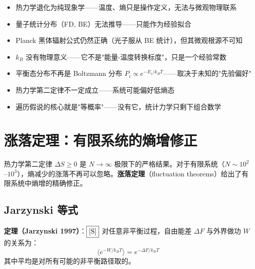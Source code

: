 \begin{limitbox}[若无 $S = k_B\ln W$（无微观-宏观桥梁）]
  \begin{itemize}
    \item 热力学退化为纯现象学——温度、熵只是操作定义，无法与微观物理联系
    \item 量子统计分布（FD, BE）无法推导——只能作为经验拟合
    \item Planck 黑体辐射公式仍然正确（光子服从 BE 统计），但其微观根源不可知
    \item $k_B$ 没有物理意义——它不是"能量-温度转换标度"，只是一个经验常数
  \end{itemize}
\end{limitbox}

\begin{limitbox}
  \begin{itemize}
    \item 平衡态分布不再是 Boltzmann 分布 $P_i \propto e^{-E_i/k_BT}$——取决于未知的"先验偏好"
    \item 热力学第二定律不一定成立——系统可能偏好低熵态
    \item 遍历假说的核心就是"等概率"——没有它，统计力学只剩下组合数学
  \end{itemize}
\end{limitbox}

\section{涨落定理：有限系统的熵增修正}

热力学第二定律 $\Delta S \ge 0$ 是 $N \to \infty$ 极限下的严格结果。对于有限系统（$N \sim 10^2$--$10^3$），熵减少的涨落不再可以忽略。\textbf{涨落定理}（fluctuation theorems）给出了有限系统中熵增的精确修正。

\subsection{Jarzynski 等式}

\textbf{定理（Jarzynski 1997）}：$\fbox{[S]}$ 对任意非平衡过程，自由能差 $\Delta F$ 与外界做功 $W$ 的关系为：
\begin{equation}
\boxed{\langle e^{-W/k_BT} \rangle = e^{-\Delta F/k_BT}}
\end{equation}
其中平均是对所有可能的非平衡路径取的。


